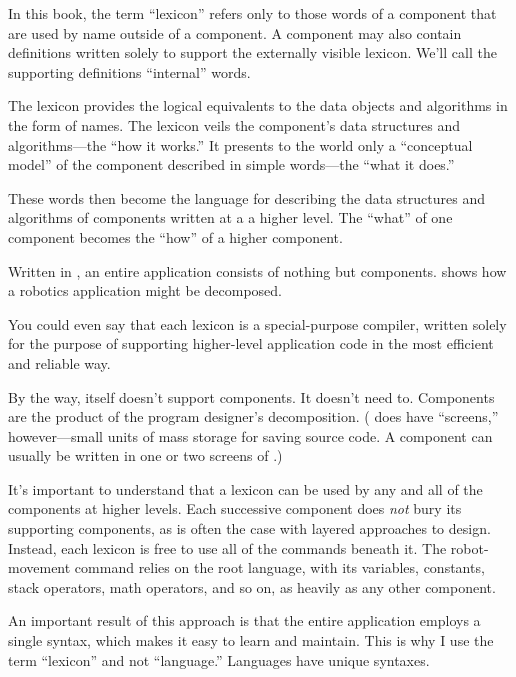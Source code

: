 In this book, the term ``lexicon'' refers only to those words of a
component that are used by name outside of a component. A component
may also contain definitions written solely to support the externally
visible lexicon. We'll call the supporting definitions ``internal''
words.


The lexicon provides the logical equivalents to the data objects and
algorithms in the form of names. The lexicon veils the component's
data structures and algorithms---the ``how it works.'' It presents to
the world only a ``conceptual model'' of the component described in
simple words---the ``what it does.''

These words then become the language for describing the data
structures and algorithms of components written at a a higher level.
The ``what'' of one component becomes the ``how'' of a higher component.


Written in \Forth{}, an entire application consists of nothing but
components.   shows how a robotics application might be
decomposed.

You could even say that each lexicon is a special-purpose compiler,
written solely for the purpose of supporting higher-level application
code in the most efficient and reliable way.

By the way, \Forth{} itself doesn't support components. It doesn't need
to. Components are the product of the program designer's decomposition.
(\Forth{} does have ``screens,''%
however---small units of mass storage for saving source code. A
component can usually be written in one or two screens of \Forth{}.)

It's important to understand that a lexicon can be used by any and
all of the components at higher levels. Each successive component
does \emph{not} bury its supporting components, as is often the case
with layered approaches to design. Instead, each lexicon is free to
use all of the commands beneath it. The robot-movement command relies
on the root language, with its variables, constants, stack operators,
math operators, and so on, as heavily as any other component.%
%

An important result of this approach is that the entire application
employs a single syntax, which makes it easy to learn and maintain.
This is why I use the term ``lexicon'' and not ``language.''
Languages have unique syntaxes.%

